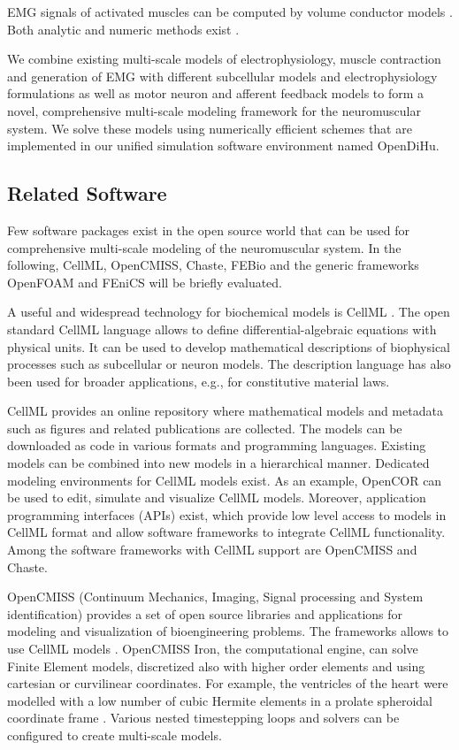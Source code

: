 EMG signals of activated muscles can be computed by volume conductor models \cite{Mesin2013}. Both 
 analytic \cite{Dimitrov1998, Farina2001, Mesin2006} and numeric methods exist \cite{Lowery2002, Mordhorst2015, Mordhorst2017, Klotz2020}.

We combine existing multi-scale models of electrophysiology, muscle contraction and generation of EMG with different subcellular models and electrophysiology formulations as well as motor neuron and afferent feedback models to form a novel, comprehensive multi-scale modeling framework for the neuromuscular system. We solve these models using numerically efficient schemes that are implemented in our unified simulation software environment named OpenDiHu.
 
\subsection{Related Software}\label{sec:intro_related_software}
Few software packages exist in the open source world that can be used for comprehensive multi-scale modeling of the neuromuscular system. In the following, CellML, OpenCMISS, Chaste, FEBio and the generic frameworks OpenFOAM and FEniCS will be briefly evaluated.

A useful and widespread technology for biochemical models is CellML \cite{Cellml2003,Lloyd2004}. The open standard CellML language allows to define differential-algebraic equations with physical units. It can be used to develop mathematical descriptions of biophysical processes such as subcellular or neuron models. The description language has also been used for broader applications, e.g., for constitutive material laws. 

CellML provides an online repository where mathematical models and metadata such as figures and related publications are collected. The models can be downloaded as code in various formats and programming languages. Existing models can be combined into new models in a hierarchical manner. Dedicated modeling environments for CellML models exist. As an example, OpenCOR \cite{OpenCOR2015} can be used to edit, simulate and visualize CellML models. Moreover, application programming interfaces (APIs) exist, which provide low level access to models in CellML format and allow software frameworks to integrate CellML functionality.
Among the software frameworks with CellML support are OpenCMISS and Chaste.

OpenCMISS (Continuum Mechanics, Imaging, Signal processing and System identification) \cite{Bradley2011} provides a set of open source libraries and applications for modeling and visualization of bioengineering problems. The frameworks allows to use CellML models \cite{Nickerson2014}.
OpenCMISS Iron, the computational engine, can solve Finite Element models, discretized also with higher order elements and using cartesian or curvilinear coordinates. For example, the ventricles of the heart were modelled with a low number of cubic Hermite elements in a prolate spheroidal coordinate frame \cite{smith2004multiscale}.
Various nested timestepping loops and solvers can be configured to create multi-scale models. 

